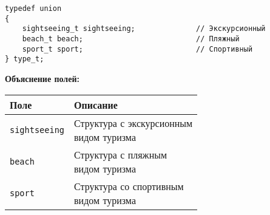 \begin{lstlisting}[caption={Объединение видов туризма}, label={lst:listing2}]
typedef union 
{
	sightseeing_t sightseeing;              // Экскурсионный
	beach_t beach;                          // Пляжный
	sport_t sport;                          // Спортивный
} type_t;
\end{lstlisting}

\noindent\textbf{Объяснение полей:}
\newline
\begin{tabular}{|l|l|}
	\hline
	\textbf{Поле} & \textbf{Описание} \\
	\hline
	\texttt{sightseeing} & \makecell{Структура с экскурсионным\\видом туризма} \\
	\hline
	\texttt{beach} & \makecell{Структура с пляжным\\видом туризма} \\
	\hline
	\texttt{sport} & \makecell{Структура со спортивным\\видом туризма} \\
	\hline
\end{tabular}
\vspace{2em}

